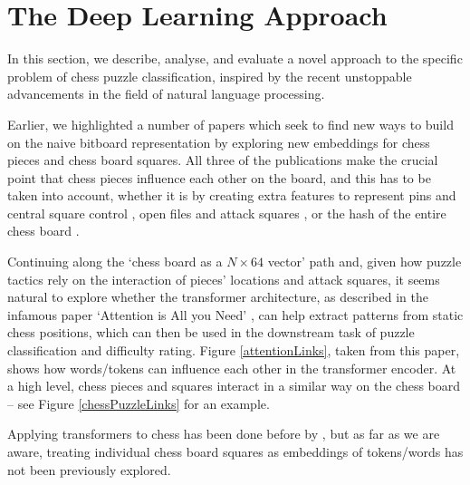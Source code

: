 \chapter{The Deep Learning Approach}\label{mlChapter}

In this section, we describe, analyse, and evaluate a novel approach to the
specific problem of chess puzzle classification, inspired by the recent
unstoppable advancements in the field of natural language processing.

Earlier, we highlighted a number of papers which seek to find new ways to build
on the naive bitboard representation \citep{middleGamePatterns, chessCNN,
chess2vec} by exploring new embeddings for chess pieces and chess board
squares. All three of the publications make the crucial point that chess pieces
influence each other on the board, and this has to be taken into account,
whether it is by creating extra features to represent pins and central square
control \citep{chessCNN}, open files and attack squares
\citep{middleGamePatterns}, or the hash of the entire chess board
\cite{chess2vec}.

Continuing along the `chess board as a $N\times64$ vector' path and, given how
puzzle tactics rely on the interaction of pieces' locations and attack squares,
it seems natural to explore whether the transformer architecture, as described
in the infamous paper `Attention is All you Need' \citep{attention}, can help
extract patterns from static chess positions, which can then be used in the
downstream task of puzzle classification and difficulty rating. Figure
\ref{attentionLinks}, taken from this paper, shows how words/tokens can
influence each other in the transformer encoder. At a high level, chess pieces
and squares interact in a similar way on the chess board -- see Figure
\ref{chessPuzzleLinks} for an example.

Applying transformers to chess has been done before by
\citet{chessTransformer}, but as far as we are aware, treating individual chess
board squares as embeddings of tokens/words has not been previously explored.

